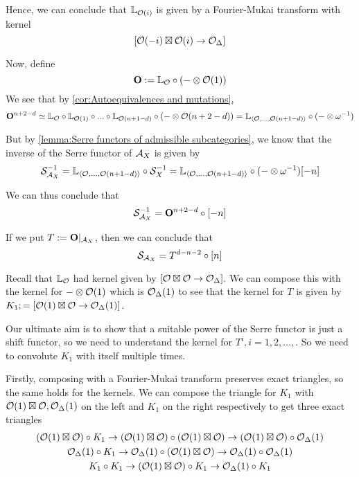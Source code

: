 Hence, we can conclude that $\mathbb{L}_{\mathcal{O}(i)}$ is given by a Fourier-Mukai transform with kernel $$[\mathcal{O}(-i)\boxtimes \mathcal{O}(i)\rightarrow \mathcal{O}_\Delta]$$

Now, define $$\mathbf{O}:=\mathbb{L}_{\mathcal{O}} \circ (-\otimes \mathcal{O}(1))$$
We see that by \ref{cor:Autoequivalences and mutations}, $$\mathbf{O}^{n+2-d}\simeq \mathbb{L}_{\mathcal{O}} \circ \mathbb{L}_{\mathcal{O}(1)}\circ ... \circ \mathbb{L}_{\mathcal{O}(n+1-d)}\circ (-\otimes \mathcal{O}(n+2-d))=\mathbb{L}_{\langle \mathcal{O}, \dots, \mathcal{O}(n+1-d) \rangle} \circ (-\otimes \omega ^{-1})$$

But by \ref{lemma:Serre functors of admissible subcategories}, we know that the inverse of the Serre functor of $\mathcal{A}_X$ is given by $$\mathcal{S}_{\mathcal{A}_X}^{-1} =  \mathbb{L}_{\langle \mathcal{O}, \dots, \mathcal{O}(n+1-d) \rangle} \circ \mathcal{S}_X ^{-1}=\mathbb{L}_{\langle \mathcal{O}, \dots, \mathcal{O}(n+1-d) \rangle} \circ (-\otimes \omega^{-1})[-n]$$

We can thus conclude that $$\mathcal{S}_{\mathcal{A}_X}^{-1} = \mathbf{O}^{n+2-d}\circ [-n]$$

If we put $T:=\mathbf{O}|_{\mathcal{A}_X}$, then we can conclude that $$\mathcal{S}_{\mathcal{A}_X}=T^{d-n-2}\circ [n]$$

Recall that $\mathbb{L}_{\mathcal{O}}$ had kernel given by $[\mathcal{O} \boxtimes \mathcal{O} \rightarrow \mathcal{O}_\Delta]$. We can compose this with the kernel for $-\otimes \mathcal{O}(1)$ which is $\mathcal{O}_\Delta(1)$ to see that the kernel for $T$ is given by $K_1;=[\mathcal{O}(1)\boxtimes \mathcal{O} \rightarrow \mathcal{O}_\Delta(1)]$. 

Our ultimate aim is to show that a suitable power of the Serre functor is just a shift functor, so we need to understand the kernel for $T^i, i=1,2,\dots, $. So we need to convolute $K_1$ with itself multiple times. 


Firstly, composing with a Fourier-Mukai transform preserves exact triangles, so the same holds for the kernels. We can compose the triangle for $K_1$ with $\mathcal{O}(1)\boxtimes \mathcal{O}, \mathcal{O}_\Delta(1)$ on the left and $K_1$ on the right respectively to get three exact triangles \begin{gather*}
    (\mathcal{O}(1)\boxtimes \mathcal{O}) \circ K_1 \rightarrow (\mathcal{O}(1)\boxtimes \mathcal{O})  \circ (\mathcal{O}(1)\boxtimes \mathcal{O}) \rightarrow (\mathcal{O}(1)\boxtimes \mathcal{O}) \circ \mathcal{O}_\Delta(1)\\
    \mathcal{O}_\Delta(1)\circ K_1 \rightarrow \mathcal{O}_\Delta(1) \circ (\mathcal{O}(1)\boxtimes \mathcal{O})  \rightarrow \mathcal{O}_\Delta(1) \circ \mathcal{O}_\Delta(1)\\
    K_1 \circ K_1  \rightarrow (\mathcal{O}(1)\boxtimes \mathcal{O})\circ K_1 \rightarrow \mathcal{O}_\Delta(1)\circ K_1
\end{gather*}


